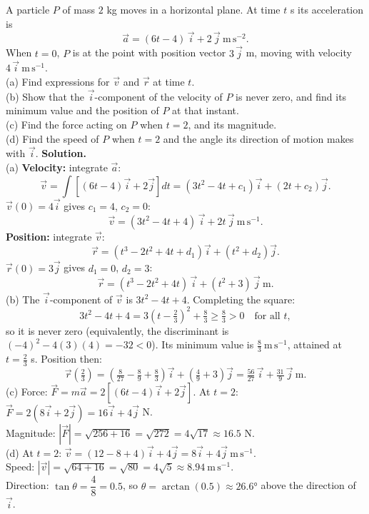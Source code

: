\documentclass[11pt]{article}
\begin{document}
\begin{exoresolu}
A particle $P$ of mass $2$ kg moves in a horizontal plane. At time $t$ s its acceleration is
\[ \vec{a} = (6t - 4)\,\vec{i} + 2\,\vec{j}\ \mathrm{m\,s^{-2}}. \]
When $t = 0$, $P$ is at the point with position vector $3\,\vec{j}$ m, moving with velocity $4\,\vec{i}\ \mathrm{m\,s^{-1}}$.\\
(a) Find expressions for $\vec{v}$ and $\vec{r}$ at time $t$.\\
(b) Show that the $\vec{i}$-component of the velocity of $P$ is never zero, and find its minimum value and the position of $P$ at that instant.\\
(c) Find the force acting on $P$ when $t = 2$, and its magnitude.\\
(d) Find the speed of $P$ when $t = 2$ and the angle its direction of motion makes with $\vec{i}$.
\tcblower
\textbf{Solution.}\\
(a) \textbf{Velocity:} integrate $\vec{a}$:
\[ \vec{v} = \int \left[(6t-4)\vec{i} + 2\vec{j}\right] dt = (3t^2 - 4t + c_1)\vec{i} + (2t + c_2)\vec{j}. \]
$\vec{v}(0) = 4\vec{i}$ gives $c_1 = 4$, $c_2 = 0$:
\[ \vec{v} = (3t^2 - 4t + 4)\,\vec{i} + 2t\,\vec{j}\ \mathrm{m\,s^{-1}}. \]
\textbf{Position:} integrate $\vec{v}$:
\[ \vec{r} = (t^3 - 2t^2 + 4t + d_1)\vec{i} + (t^2 + d_2)\vec{j}. \]
$\vec{r}(0) = 3\vec{j}$ gives $d_1 = 0$, $d_2 = 3$:
\[ \vec{r} = (t^3 - 2t^2 + 4t)\,\vec{i} + (t^2 + 3)\,\vec{j}\ \text{m}. \]
(b) The $\vec{i}$-component of $\vec{v}$ is $3t^2 - 4t + 4$. Completing the square:
\[ 3t^2 - 4t + 4 = 3\left(t - \tfrac{2}{3}\right)^2 + \tfrac{8}{3} \geq \tfrac{8}{3} > 0 \quad \text{for all } t, \]
so it is never zero (equivalently, the discriminant is $(-4)^2 - 4(3)(4) = -32 < 0$). Its minimum value is $\tfrac{8}{3}\ \mathrm{m\,s^{-1}}$, attained at $t = \tfrac{2}{3}$ s. Position then:
\[ \vec{r}\left(\tfrac{2}{3}\right) = \left(\tfrac{8}{27} - \tfrac{8}{9} + \tfrac{8}{3}\right)\vec{i} + \left(\tfrac{4}{9} + 3\right)\vec{j} = \tfrac{56}{27}\,\vec{i} + \tfrac{31}{9}\,\vec{j}\ \text{m}. \]
(c) Force: $\vec{F} = m\vec{a} = 2\left[(6t-4)\vec{i} + 2\vec{j}\right]$. At $t = 2$: $\vec{F} = 2(8\vec{i} + 2\vec{j}) = 16\vec{i} + 4\vec{j}$ N.\\
Magnitude: $|\vec{F}| = \sqrt{256 + 16} = \sqrt{272} = 4\sqrt{17} \approx 16.5$ N.\\[4pt]
(d) At $t = 2$: $\vec{v} = (12 - 8 + 4)\vec{i} + 4\vec{j} = 8\vec{i} + 4\vec{j}\ \mathrm{m\,s^{-1}}$.\\
Speed: $|\vec{v}| = \sqrt{64 + 16} = \sqrt{80} = 4\sqrt{5} \approx 8.94\ \mathrm{m\,s^{-1}}$.\\
Direction: $\tan\theta = \dfrac{4}{8} = 0.5$, so $\theta = \arctan(0.5) \approx 26.6°$ above the direction of $\vec{i}$.
\end{exoresolu}
\end{document}
